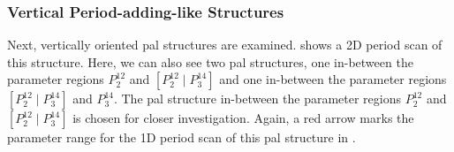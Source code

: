 \subsubsection{Vertical Period-adding-like Structures}

Next, vertically oriented \gls{pal} structures are examined.
 shows a 2D period scan of this structure.
Here, we can also see two \gls{pal} structures, one in-between the parameter regions $P^{12}_2$ and $\left[P^{12}_2 \mid P^{14}_3\right]$ and one in-between the parameter regions $\left[P^{12}_2 \mid P^{14}_3\right]$ and $P^{14}_3$.
The \gls{pal} structure in-between the parameter regions $P^{12}_2$ and $\left[P^{12}_2 \mid P^{14}_3\right]$ is chosen for closer investigation.
Again, a red arrow marks the parameter range for the 1D period scan of this \gls{pal} structure in .

